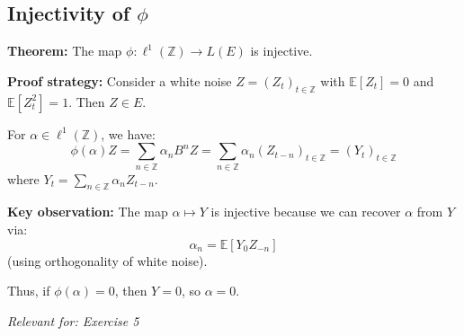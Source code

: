 \documentclass[a4paper, 12pt]{article}
\begin{document}
\subsection{Injectivity of $\phi$}
\textbf{Theorem:} The map $\phi: \ell^1(\mathbb{Z}) \to L(E)$ is injective.

\textbf{Proof strategy:} Consider a white noise $Z = (Z_t)_{t \in \mathbb{Z}}$ with $\mathbb{E}[Z_t] = 0$ and $\mathbb{E}[Z_t^2] = 1$. Then $Z \in E$.

For $\alpha \in \ell^1(\mathbb{Z})$, we have:
\[
\phi(\alpha)Z = \sum_{n \in \mathbb{Z}} \alpha_n B^n Z = \sum_{n \in \mathbb{Z}} \alpha_n (Z_{t-n})_{t \in \mathbb{Z}} = (Y_t)_{t \in \mathbb{Z}}
\]
where $Y_t = \sum_{n \in \mathbb{Z}} \alpha_n Z_{t-n}$.

\textbf{Key observation:} The map $\alpha \mapsto Y$ is injective because we can recover $\alpha$ from $Y$ via:
\[
\alpha_n = \mathbb{E}[Y_0 Z_{-n}]
\]
(using orthogonality of white noise).

Thus, if $\phi(\alpha) = 0$, then $Y = 0$, so $\alpha = 0$.

\textit{Relevant for: Exercise 5}
\end{document}
